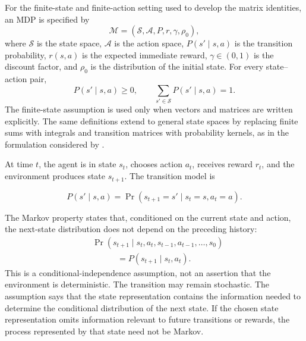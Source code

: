 For the finite-state and finite-action setting used to develop the matrix
identities, an MDP is specified by
\begin{equation}
    \mathcal{M}
    = (\mathcal{S},\mathcal{A},P,r,\gamma,\rho_0),
    \label{eq:rl-mdp-tuple}
\end{equation}
where $\mathcal{S}$ is the state space, $\mathcal{A}$ is the action space,
$P(s'\mid s,a)$ is the transition probability, $r(s,a)$ is the expected
immediate reward, $\gamma\in(0,1)$ is the discount factor, and $\rho_0$ is the
distribution of the initial state. For every state--action pair,
\begin{equation}
    P(s'\mid s,a)\geq 0,
    \qquad
    \sum_{s'\in\mathcal{S}}P(s'\mid s,a)=1.
    \label{eq:rl-transition-normalization}
\end{equation}
The finite-state assumption is used only when vectors and matrices are written
explicitly. The same definitions extend to general state spaces by replacing
finite sums with integrals and transition matrices with probability kernels,
as in the formulation considered by \textcite{scherrer2014approximate}.

At time $t$, the agent is in state $s_t$, chooses action $a_t$, receives reward
$r_t$, and the environment produces state $s_{t+1}$. The transition model is

\begin{equation}
    P(s'\mid s,a)
    = \Pr(s_{t+1}=s'\mid s_t=s,a_t=a).
    \label{eq:rl-transition-kernel}
\end{equation}

The Markov property states that, conditioned on the current state and action,
the next-state distribution does not depend on the preceding history:
\begin{equation}
\begin{split}
    &\Pr(s_{t+1}\mid s_t,a_t,s_{t-1},a_{t-1},\ldots,s_0)\\
    &\hspace{3em}=P(s_{t+1}\mid s_t,a_t).
\end{split}
\label{eq:rl-markov-property}
\end{equation}
This is a conditional-independence assumption, not an assertion that the
environment is deterministic. The transition may remain stochastic. The
assumption says that the state representation contains the information needed
to determine the conditional distribution of the next state. If the chosen
state representation omits information relevant to future transitions or
rewards, the process represented by that state need not be Markov.

